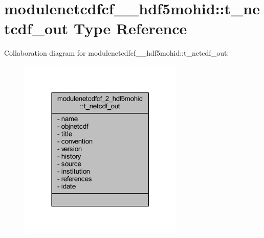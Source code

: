 \hypertarget{structmodulenetcdfcf__2__hdf5mohid_1_1t__netcdf__out}{}\section{modulenetcdfcf\+\_\+\_\+hdf5mohid\+:\+:t\+\_\+netcdf\+\_\+out Type Reference}
\label{structmodulenetcdfcf__2__hdf5mohid_1_1t__netcdf__out}


Collaboration diagram for modulenetcdfcf\+\_\+\_\+hdf5mohid\+:\+:t\+\_\+netcdf\+\_\+out\+:\nopagebreak
\begin{figure}[H]
\begin{center}
\leavevmode
\includegraphics[width=222pt]{structmodulenetcdfcf__2__hdf5mohid_1_1t__netcdf__out__coll__graph}
\end{center}
\end{figure}
